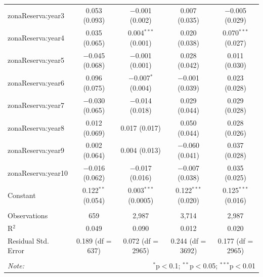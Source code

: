 \documentclass[utf8]{frontiers_suppmat} %
\begin{document}
\begin{table}[!htbp]
\begin{tabular}{@{\extracolsep{1pt}}lcccc}
  zonaReserva:year3 & 0.053 (0.093) & $-$0.001 (0.002) & 0.007 (0.035) & $-$0.005 (0.029) \\ 
  zonaReserva:year4 & 0.035 (0.065) & 0.004$^{***}$ (0.001) & 0.020 (0.038) & 0.070$^{***}$ (0.027) \\ 
  zonaReserva:year5 & $-$0.045 (0.068) & $-$0.001 (0.001) & 0.028 (0.042) & 0.011 (0.030) \\ 
  zonaReserva:year6 & 0.096 (0.075) & $-$0.007$^{*}$ (0.004) & $-$0.001 (0.039) & 0.023 (0.028) \\ 
  zonaReserva:year7 & $-$0.030 (0.065) & $-$0.014 (0.018) & 0.029 (0.044) & 0.029 (0.028) \\ 
  zonaReserva:year8 & 0.012 (0.069) & 0.017 (0.017) & 0.050 (0.044) & 0.028 (0.026) \\ 
  zonaReserva:year9 & 0.002 (0.064) & 0.004 (0.013) & $-$0.060 (0.041) & 0.037 (0.028) \\ 
  zonaReserva:year10 & $-$0.016 (0.062) & $-$0.017 (0.016) & $-$0.007 (0.038) & 0.035 (0.025) \\ 
  Constant & 0.122$^{**}$ (0.054) & 0.003$^{***}$ (0.0005) & 0.122$^{***}$ (0.020) & 0.125$^{***}$ (0.016) \\ 
 \hline \\[-1.8ex] 
Observations & 659 & 2,987 & 3,714 & 2,987 \\ 
R$^{2}$ & 0.049 & 0.090 & 0.012 & 0.020 \\ 
Residual Std. Error & 0.189 (df = 637) & 0.072 (df = 2965) & 0.244 (df = 3692) & 0.177 (df = 2965) \\ 
\hline 
\hline \\[-1.8ex] 
\textit{Note:}  & \multicolumn{4}{r}{$^{*}$p$<$0.1; $^{**}$p$<$0.05; $^{***}$p$<$0.01} \\ 
\end{tabular} 
\end{table}

\clearpage
\end{document}
